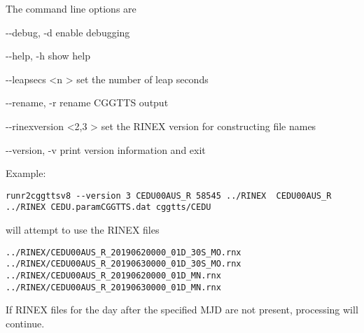 The command line options are
\begin{description*}
	\item[-{}-debug, -d]   enable debugging 
	\item[-{}-help, -h]    show help
	\item[-{}-leapsecs \textless n \textgreater ] set the number of leap seconds
	\item[-{}-rename, -r]  rename CGGTTS output
	\item[-{}-rinexversion \textless 2,3 \textgreater ]  set the RINEX version for constructing file names
	\item[-{}-version, -v] print version information	and exit
\end{description*}
Example:
\begin{lstlisting}
runr2cggttsv8 --version 3 CEDU00AUS_R 58545 ../RINEX  CEDU00AUS_R ../RINEX CEDU.paramCGGTTS.dat cggtts/CEDU 
\end{lstlisting}
will attempt to use the RINEX files
\begin{lstlisting}
../RINEX/CEDU00AUS_R_20190620000_01D_30S_MO.rnx
../RINEX/CEDU00AUS_R_20190630000_01D_30S_MO.rnx
../RINEX/CEDU00AUS_R_20190620000_01D_MN.rnx
../RINEX/CEDU00AUS_R_20190630000_01D_MN.rnx
\end{lstlisting}

If RINEX files for the day after the specified MJD are not present, processing will continue.


